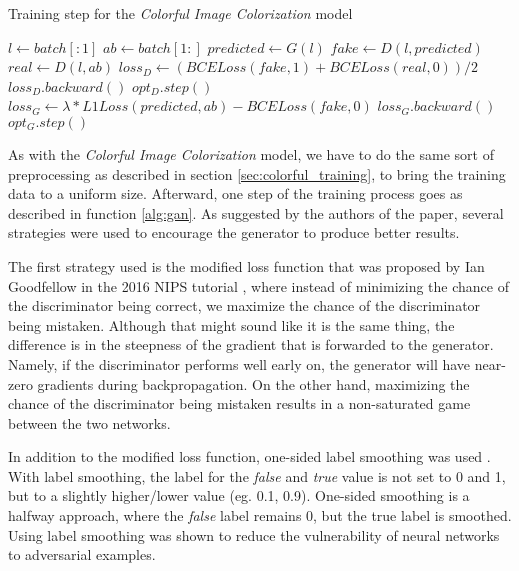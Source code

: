\begin{algorithm}[!ht]
	\caption{Training step for the \textit{Colorful Image Colorization} model}
	\label{alg:gan}
	\begin{algorithmic}		
			\State $l \leftarrow batch[:1]$	
			\State $ab \leftarrow batch[1:]$
			\State $predicted \leftarrow G(l)$
			\State $fake \leftarrow D(l, predicted)$
			\State $real \leftarrow D(l, ab)$
			\State $loss_D \leftarrow (BCELoss(fake, 1) + BCELoss(real, 0))/2$
			\State $loss_D.backward()$
			\State $opt_D.step()$
			\State $loss_G \leftarrow \lambda * L1Loss(predicted, ab) - BCELoss(fake, 0)$
			\State $loss_G.backward()$
			\State $opt_G.step()$
		\EndFunction
	\end{algorithmic}
\end{algorithm}

As with the \textit{Colorful Image Colorization} model, we have to do the same sort of 
preprocessing as described in section \ref{sec:colorful_training}, to bring the training
data to a uniform size. Afterward, one step of the training process goes as described in 
function \ref{alg:gan}. As suggested by the authors of the paper, several strategies 
were used to encourage the generator to produce better results.

The first strategy used is the modified loss function that was proposed by Ian Goodfellow
in the 2016 NIPS tutorial \citep{goodfellow2017nips}, where instead of minimizing 
the chance of the discriminator being correct, we maximize the chance of the discriminator 
being mistaken. Although that might sound like it is the same thing, the difference 
is in the steepness of the gradient that is forwarded to the generator. Namely, if the 
discriminator performs well early on, the generator will have near-zero gradients
during backpropagation. On the other hand, maximizing the chance of the discriminator
being mistaken results in a non-saturated game between the two networks.

In addition to the modified loss function, one-sided label smoothing was used 
\citep{salimans2016improved_gans}. With label smoothing, the label for the \textit{false} and 
\textit{true} value is not set to 0 and 1, but to a slightly higher/lower value (eg. 0.1, 0.9). 
One-sided smoothing is a halfway approach, where the \textit{false} label remains 0, but the 
true label is smoothed. Using label smoothing was shown to reduce the vulnerability of 
neural networks to adversarial examples.

